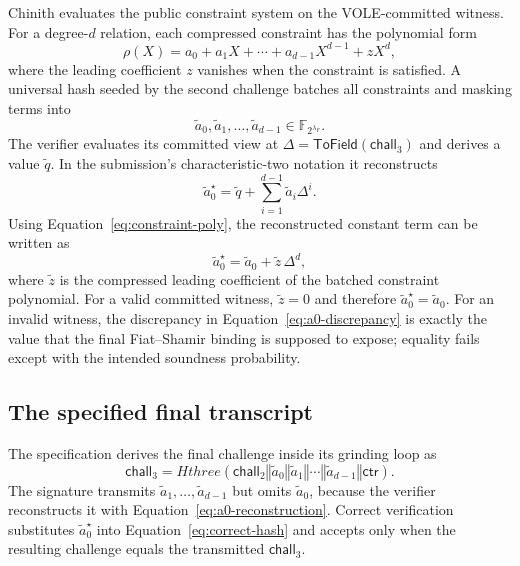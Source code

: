 \documentclass[11pt,a4paper]{article}
\newcommand{\F}{\mathbb{F}}
\newcommand{\concat}{\mathbin\Vert}
\begin{document}
Chinith evaluates the public constraint system on the VOLE-committed witness.
For a degree-$d$ relation, each compressed constraint has the polynomial form
\begin{equation}
  \rho(X)=a_0+a_1X+\cdots+a_{d-1}X^{d-1}+zX^d,
\label{eq:constraint-poly}
\end{equation}
where the leading coefficient $z$ vanishes when the constraint is satisfied.
A universal hash seeded by the second challenge batches all constraints and
masking terms into
\[
             \widetilde a_0,\widetilde a_1,\ldots,
             \widetilde a_{d-1}\in\F_{2^{\lambda_F}}.
\]
The verifier evaluates its committed view at
$\Delta=\mathsf{ToField}(\mathsf{chall}_3)$ and derives a value
$\widetilde q$.  In the submission's characteristic-two notation it
reconstructs
\begin{equation}
  \widetilde a_0^{\star}
    =\widetilde q+
      \sum_{i=1}^{d-1}\widetilde a_i\Delta^i.
\label{eq:a0-reconstruction}
\end{equation}
Using Equation~\eqref{eq:constraint-poly}, the reconstructed constant term can
be written as
\begin{equation}
  \widetilde a_0^{\star}
    = \widetilde a_0 + \widetilde z\,\Delta^d,
\label{eq:a0-discrepancy}
\end{equation}
where $\widetilde z$ is the compressed leading coefficient of the batched
constraint polynomial.  For a valid committed witness, $\widetilde z=0$ and
therefore $\widetilde a_0^{\star}=\widetilde a_0$.  For an invalid witness,
the discrepancy in Equation~\eqref{eq:a0-discrepancy} is exactly the value
that the final Fiat--Shamir binding is supposed to expose; equality fails
except with the intended soundness probability.

\subsection{The specified final transcript}

The specification derives the final challenge inside its grinding loop as
\begin{equation}
 \mathsf{chall}_3=Hthree(
    \mathsf{chall}_2\concat
    \widetilde a_0\concat\widetilde a_1\concat\cdots\concat
    \widetilde a_{d-1}\concat\mathsf{ctr}).
\label{eq:correct-hash}
\end{equation}
The signature transmits $\widetilde a_1,\ldots,\widetilde a_{d-1}$ but omits
$\widetilde a_0$, because the verifier reconstructs it with
Equation~\eqref{eq:a0-reconstruction}.  Correct verification substitutes
$\widetilde a_0^{\star}$ into Equation~\eqref{eq:correct-hash} and accepts only
when the resulting challenge equals the transmitted $\mathsf{chall}_3$.
\end{document}
